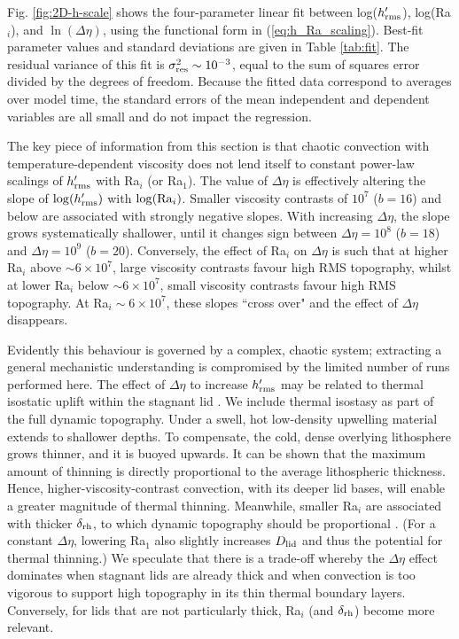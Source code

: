 Fig. \ref{fig:2D-h-scale} shows the four-parameter linear fit between log($h_{\rm rms}^\prime$), log(Ra$_i$), and $\ln(\Delta \eta)$, using the functional form in (\ref{eq:h_Ra_scaling}). Best-fit parameter values and standard deviations are given in Table \ref{tab:fit}. The residual variance of this fit is $\sigma^2_{\rm res} \sim 10^{-3}$, equal to the sum of squares error divided by the degrees of freedom. Because the fitted data correspond to averages over model time, the standard errors of the mean independent and dependent variables are all small and do not impact the regression. 


The key piece of information from this section is that chaotic convection with temperature-dependent viscosity does not lend itself to constant power-law scalings of $h_{\rm rms}^\prime$ with Ra$_i$ (or Ra$_1$). The value of $\Delta \eta$ is effectively altering the slope of $\log(h_{\rm rms}^\prime)$ with $\log({\rm Ra}_i)$. Smaller viscosity contrasts of $10^7$ ($b=16$) and below are associated with strongly negative slopes. With increasing $\Delta \eta$, the slope grows systematically shallower, until it changes sign between $\Delta \eta = 10^8$ ($b=18$) and $\Delta \eta = 10^9$ ($b=20$). %
Conversely, the effect of Ra$_i$ on $\Delta \eta$ is such that at higher Ra$_i$ above $\sim 6 \times 10^7$, large viscosity contrasts favour high RMS topography, whilst at lower Ra$_i$ below $\sim 6 \times 10^7$, small viscosity contrasts favour high RMS topography. At Ra$_i \sim 6 \times 10^7$, these slopes ``cross over" and the effect of $\Delta \eta$ disappears. 

Evidently this behaviour is governed by a complex, chaotic system; extracting a general mechanistic understanding is compromised by the limited number of runs performed here. The effect of $\Delta \eta$ to increase $h_{\rm rms}^\prime$ may be related to thermal isostatic uplift within the stagnant lid \citep{kucinskas_isostatic_1994, moore_lithospheric_1995, orth_isostatic_2011}. We  include thermal isostasy as part of the full dynamic topography. Under a swell, hot low-density upwelling material extends to shallower depths. To compensate, the cold, dense overlying lithosphere grows thinner, and it is buoyed upwards. It can be shown that the maximum amount of thinning is directly proportional to the average lithospheric thickness. Hence, higher-viscosity-contrast convection, with its deeper lid bases, will enable a greater magnitude of thermal thinning. Meanwhile, smaller Ra$_i$ are associated with thicker $\delta_{\rm rh}$, to which dynamic topography should be proportional \citep{parsons_relationship_1983}. (For a constant $\Delta \eta$, lowering Ra$_1$ also slightly increases $D_{\rm lid}$ and thus the potential for thermal thinning.) We speculate that there is a trade-off whereby the $\Delta \eta$ effect dominates when stagnant lids are already thick and when convection is too vigorous to support high topography in its thin thermal boundary layers. Conversely, for lids that are not particularly thick, Ra$_i$ (and $\delta_{\rm rh}$) become more relevant.


